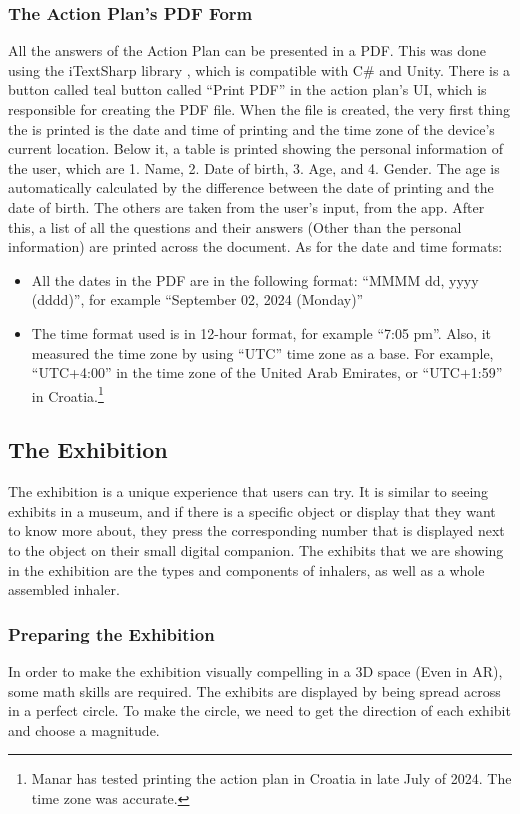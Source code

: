 \subsubsection{The Action Plan’s PDF Form}
All the answers of the Action Plan can be presented in a PDF. This was done using the iTextSharp library \cite{iTextSharp}, which is compatible with C\# and Unity. There is a button called teal button called “Print PDF” in the action plan’s UI, which is responsible for creating the PDF file. When the file is created, the very first thing the is printed is the date and time of printing and the time zone of the device’s current location. Below it, a table is printed showing the personal information of the user, which are 1. Name, 2. Date of birth, 3. Age, and 4. Gender. The age is automatically calculated by the difference between the date of printing and the date of birth. The others are taken from the user’s input, from the app. After this, a list of all the questions and their answers (Other than the personal information) are printed across the document. As for the date and time formats:
\begin{itemize}
    \item{All the dates in the PDF are in the following format: “MMMM dd, yyyy (dddd)”, for example “September 02, 2024 (Monday)”}
    
    \item{The time format used is in 12-hour format, for example “7:05 pm”. Also, it measured the time zone by using “UTC” time zone as a base. For example, “UTC+4:00” in the time zone of the United Arab Emirates, or “UTC+1:59” in Croatia.\footnote{Manar has tested printing the action plan in Croatia in late July of 2024. The time zone was accurate.}}
\end{itemize}

\subsection{The Exhibition}
The exhibition is a unique experience that users can try. It is similar to seeing exhibits in a museum, and if there is a specific object or display that they want to know more about, they press the corresponding number that is displayed next to the object on their small digital companion. The exhibits that we are showing in the exhibition are the types and components of inhalers, as well as a whole assembled inhaler.

\subsubsection{Preparing the Exhibition}
 In order to make the exhibition visually compelling in a 3D space (Even in AR), some math skills are required. The exhibits are displayed by being spread across in a perfect circle. To make the circle, we need to get the direction of each exhibit and choose a magnitude.
